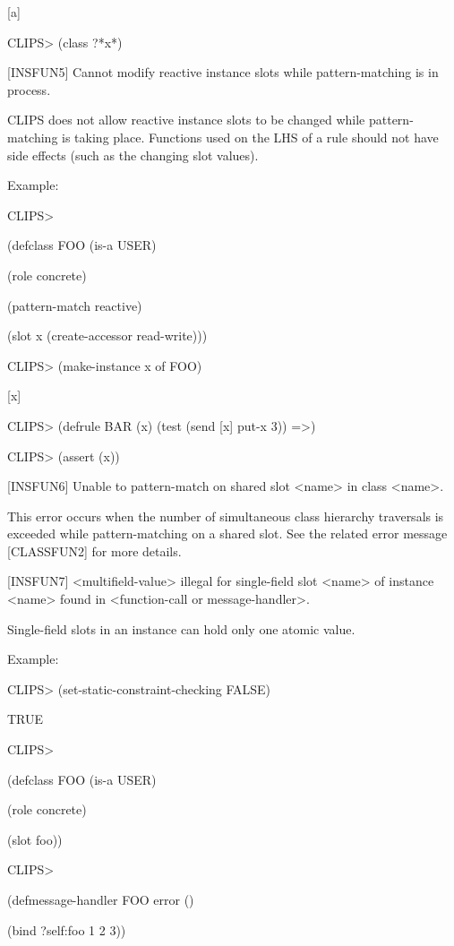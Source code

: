 \documentclass[letterpaper,10pt,english]{sphinxmanual}
\begin{document}
{[}a{]}

CLIPS\textgreater{} (class ?*x*)

{[}INSFUN5{]} Cannot modify reactive instance slots while pattern-matching
is in process.

CLIPS does not allow reactive instance slots to be changed while
pattern-matching is taking place. Functions used on the LHS of a rule
should not have side effects (such as the changing slot values).

Example:

CLIPS\textgreater{}

(defclass FOO (is-a USER)

(role concrete)

(pattern-match reactive)

(slot x (create-accessor read-write)))

CLIPS\textgreater{} (make-instance x of FOO)

{[}x{]}

CLIPS\textgreater{} (defrule BAR (x) (test (send {[}x{]} put-x 3)) =\textgreater{})

CLIPS\textgreater{} (assert (x))

{[}INSFUN6{]} Unable to pattern-match on shared slot \textless{}name\textgreater{} in class \textless{}name\textgreater{}.

This error occurs when the number of simultaneous class hierarchy
traversals is exceeded while pattern-matching on a shared slot. See the
related error message {[}CLASSFUN2{]} for more details.

{[}INSFUN7{]} \textless{}multifield-value\textgreater{} illegal for single-field slot \textless{}name\textgreater{} of
instance \textless{}name\textgreater{} found in \textless{}function-call or message-handler\textgreater{}.

Single-field slots in an instance can hold only one atomic value.

Example:

CLIPS\textgreater{} (set-static-constraint-checking FALSE)

TRUE

CLIPS\textgreater{}

(defclass FOO (is-a USER)

(role concrete)

(slot foo))

CLIPS\textgreater{}

(defmessage-handler FOO error ()

(bind ?self:foo 1 2 3))
\end{document}
